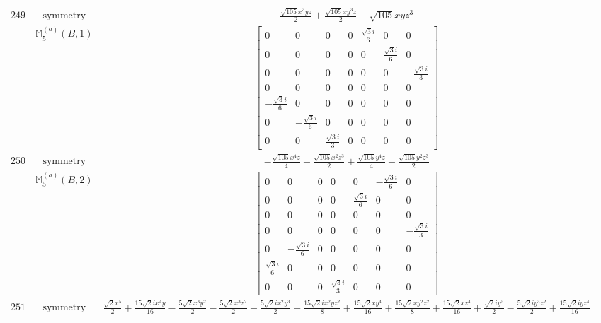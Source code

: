 \documentclass[fleqn,8pt,landscape]{jsarticle}
\begin{document}
\begin{longtable}{ccc}
$ 249 $ & $ \text{symmetry} $ & $ \frac{\sqrt{105} x^{3} y z}{2} + \frac{\sqrt{105} x y^{3} z}{2} - \sqrt{105} x y z^{3} $ \\
$  $ & $ \mathbb{M}_{5}^{(a)}(B,1) $ & $ \begin{bmatrix} 0 & 0 & 0 & 0 & \frac{\sqrt{3} i}{6} & 0 & 0 \\ 0 & 0 & 0 & 0 & 0 & \frac{\sqrt{3} i}{6} & 0 \\ 0 & 0 & 0 & 0 & 0 & 0 & - \frac{\sqrt{3} i}{3} \\ 0 & 0 & 0 & 0 & 0 & 0 & 0 \\ - \frac{\sqrt{3} i}{6} & 0 & 0 & 0 & 0 & 0 & 0 \\ 0 & - \frac{\sqrt{3} i}{6} & 0 & 0 & 0 & 0 & 0 \\ 0 & 0 & \frac{\sqrt{3} i}{3} & 0 & 0 & 0 & 0 \end{bmatrix} $ \\ \hline
$ 250 $ & $ \text{symmetry} $ & $ - \frac{\sqrt{105} x^{4} z}{4} + \frac{\sqrt{105} x^{2} z^{3}}{2} + \frac{\sqrt{105} y^{4} z}{4} - \frac{\sqrt{105} y^{2} z^{3}}{2} $ \\
$  $ & $ \mathbb{M}_{5}^{(a)}(B,2) $ & $ \begin{bmatrix} 0 & 0 & 0 & 0 & 0 & - \frac{\sqrt{3} i}{6} & 0 \\ 0 & 0 & 0 & 0 & \frac{\sqrt{3} i}{6} & 0 & 0 \\ 0 & 0 & 0 & 0 & 0 & 0 & 0 \\ 0 & 0 & 0 & 0 & 0 & 0 & - \frac{\sqrt{3} i}{3} \\ 0 & - \frac{\sqrt{3} i}{6} & 0 & 0 & 0 & 0 & 0 \\ \frac{\sqrt{3} i}{6} & 0 & 0 & 0 & 0 & 0 & 0 \\ 0 & 0 & 0 & \frac{\sqrt{3} i}{3} & 0 & 0 & 0 \end{bmatrix} $ \\ \hline
$ 251 $ & $ \text{symmetry} $ & $ \frac{\sqrt{2} x^{5}}{2} + \frac{15 \sqrt{2} i x^{4} y}{16} - \frac{5 \sqrt{2} x^{3} y^{2}}{2} - \frac{5 \sqrt{2} x^{3} z^{2}}{2} - \frac{5 \sqrt{2} i x^{2} y^{3}}{2} + \frac{15 \sqrt{2} i x^{2} y z^{2}}{8} + \frac{15 \sqrt{2} x y^{4}}{16} + \frac{15 \sqrt{2} x y^{2} z^{2}}{8} + \frac{15 \sqrt{2} x z^{4}}{16} + \frac{\sqrt{2} i y^{5}}{2} - \frac{5 \sqrt{2} i y^{3} z^{2}}{2} + \frac{15 \sqrt{2} i y z^{4}}{16} $ \\

\end{longtable}
\end{document}

